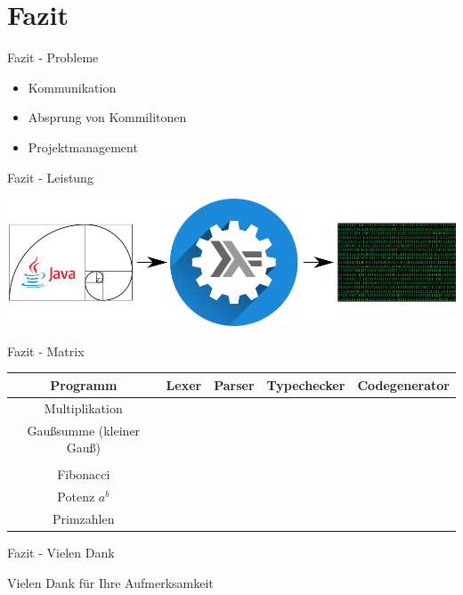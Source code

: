 \section{Fazit}

\begin{frame}{Fazit - Probleme}

\begin{itemize}
	\item Kommunikation
	\item Absprung von Kommilitonen
	\item Projektmanagement
\end{itemize}

\end{frame}


\begin{frame}{Fazit - Leistung}

\begin{center}
	\includegraphics{images/fazit/fazit.png}
\end{center}

\end{frame}


\begin{frame}{Fazit - Matrix}

\begin{center}
	\begin{tabular}{|c|c|c|c|c|}
		\hline
		Programm & Lexer & Parser & Typechecker & Codegenerator \\
		\hline
		Multiplikation & \checkmark & \checkmark & \checkmark & \checkmark \\
		\hline
		Gaußsumme (kleiner Gauß) & \checkmark & \checkmark & \checkmark & \checkmark \\
		\hline
		\text{Fakultät} & \checkmark & \checkmark & \checkmark & \checkmark \\
		\hline
		Fibonacci & \checkmark & \checkmark & \checkmark & \checkmark \\
		\hline
		Potenz $ a^{b} $ & \checkmark & \checkmark & \checkmark & \checkmark\\
		\hline
		Primzahlen & \checkmark & \checkmark & \checkmark & \checkmark \\ \hline
	\end{tabular}
\end{center}

\end{frame}


\begin{frame}{Fazit - Vielen Dank}

\begin{center}
	\Huge Vielen Dank für Ihre Aufmerksamkeit
\end{center}

\end{frame}
